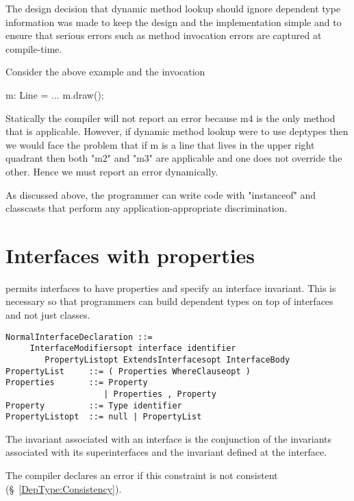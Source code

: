 \begin{rationale}
  The design decision that dynamic method lookup should ignore
  dependent type information was made to keep the design and the
  implementation simple and to ensure that serious errors such as
  method invocation errors are captured at compile-time.
 
  Consider the above example and the invocation
\begin{xten}
m: Line = ...
m.draw();    
\end{xten}


   Statically the compiler will not report an error because m4 is the
   only method that is applicable. However, if dynamic method lookup
   were to use deptypes then we would face the problem that if m is a
   line that lives in the upper right quadrant then both \xcd"m2"
   and \xcd"m3"
   are applicable and one does not override the other. Hence we must
   report an error dynamically.

   As discussed above, the programmer can write code with \xcd"instanceof"
   and classcasts that perform any application-appropriate
   discrimination.  
\end{rationale}

\section{Interfaces with properties}\label{DepType:Interface}

\Xten{} permits interfaces to have properties and specify an interface
invariant. This is necessary so that programmers can build dependent
types on top of interfaces and not just classes.

\begin{verbatim}
NormalInterfaceDeclaration ::= 
     InterfaceModifiersopt interface identifier 
        PropertyListopt ExtendsInterfacesopt InterfaceBody
PropertyList     ::= ( Properties WhereClauseopt )
Properties       ::= Property
                    | Properties , Property
Property         ::= Type identifier    
PropertyListopt  ::= null | PropertyList
\end{verbatim}
The invariant associated with an interface is the conjunction of the
invariants associated with its superinterfaces and the invariant
defined at the interface. 

\begin{staticrule*}
   The compiler declares an error if this constraint
   is not consistent (\S~\ref{DepType:Consistency}).  
\end{staticrule*}

